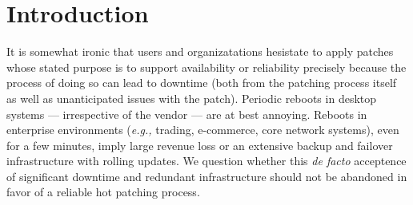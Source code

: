\section{Introduction}
\label{sec:intro}

It is somewhat ironic that users and organizatations hesistate to
apply patches whose stated purpose is to support availability or
reliability precisely because the process of doing so can lead to
downtime (both from the patching process itself as well as
unanticipated issues with the patch).  Periodic reboots in desktop
systems --- irrespective of the vendor --- are at best annoying.
Reboots in enterprise environments ({\it e.g.,} trading, e-commerce,
core network systems), even for a few minutes, imply large revenue
loss or an extensive backup and failover infrastructure with rolling
updates.  We question whether this {\em de facto} acceptence of
significant downtime and redundant infrastructure should not be
abandoned in favor of a reliable hot patching process.

%
%
%

